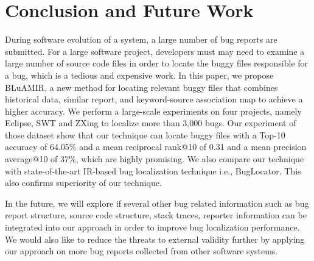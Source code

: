 \documentclass[conference]{IEEEtran}
\begin{document}
\section{Conclusion and Future Work} \label{sec:conclusionANDfuture}
During software evolution of a system, a large number of bug reports are submitted. For a large software project, developers must may need to examine a large number of source code files in order to locate the buggy files responsible for a bug, which is a tedious and expensive work. In this paper, we propose BLuAMIR, a new method for locating relevant buggy files that combines historical data, similar report, and keyword-source association map to achieve a higher accuracy. We perform a large-scale experiments on four projects, namely Eclipse, SWT and ZXing to localize more than 3,000 bugs. Our experiment of those dataset show that our technique can locate buggy files with a Top-10 accuracy of 64.05\% and a mean reciprocal rank@10 of 0.31 and a mean precision average@10 of 37\%, which are highly promising. We also compare our technique with state-of-the-art IR-based bug localization technique i.e., BugLocator. This also confirms superiority of our technique.

In the future, we will explore if several other bug related information such as bug report structure, source code structure, stack traces, reporter information can be integrated into our approach in order to improve bug localization performance. We would also like to reduce the threats to external validity further by applying our approach on more bug reports collected from other software systems.


\scriptsize

\end{document}

